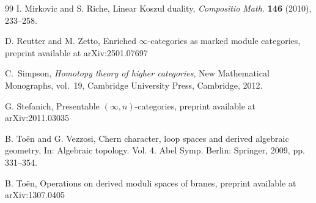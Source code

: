 \documentclass[leqno,12pt]{amsart}
\theoremstyle{plain}
\theoremstyle{definition}
\begin{document}
\begin{thebibliography}{99}
I. Mirkovic and S. Riche,
Linear Koszul duality,
\emph{Compositio Math.} \textbf{146} (2010), 233--258.

D. Reutter and M. Zetto,
Enriched $\infty$-categories as marked module categories,
preprint available at arXiv:2501.07697

C.~Simpson,
\emph{Homotopy theory of higher categories},
New Mathematical Monographs, vol.~19,
Cambridge University Press, Cambridge, 2012.

G. Stefanich,
Presentable $(\infty,n)$-categories,
preprint available at arXiv:2011.03035

B. To\"{e}n and G. Vezzosi,
Chern character, loop spaces and derived algebraic geometry,
In: Algebraic topology. Vol. 4.
Abel Symp. Berlin: Springer, 2009, pp. 331--354.

B. To\"{e}n,
Operations on derived moduli spaces of branes,
preprint available at arXiv:1307.0405







\end{thebibliography}
\end{document}
